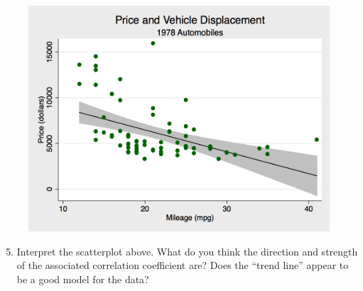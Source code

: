 \documentclass{tufte-handout}
\begin{document}
\newpage
\begin{figure}[h]
\includegraphics[scale=.46]{fig12.png}
\end{figure}

\vspace{3mm}
\begin{enumerate}
\setcounter{enumi}{4}
\item Interpret the scatterplot above. What do you think the direction and strength of the associated correlation coefficient are? Does the ``trend line'' appear to be a good model for the data?
\end{enumerate}

\end{document}
